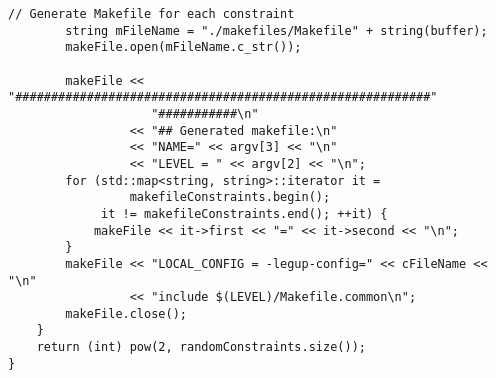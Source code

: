 \begin{lstlisting}[caption={Constraint-generation program source code}label=lst:constraintGenerating]
        // Generate Makefile for each constraint
        string mFileName = "./makefiles/Makefile" + string(buffer);
        makeFile.open(mFileName.c_str());

        makeFile << "##########################################################"
                    "###########\n"
                 << "## Generated makefile:\n"
                 << "NAME=" << argv[3] << "\n"
                 << "LEVEL = " << argv[2] << "\n";
        for (std::map<string, string>::iterator it =
                 makefileConstraints.begin();
             it != makefileConstraints.end(); ++it) {
            makeFile << it->first << "=" << it->second << "\n";
        }
        makeFile << "LOCAL_CONFIG = -legup-config=" << cFileName << "\n"
                 << "include $(LEVEL)/Makefile.common\n";
        makeFile.close();
    }
    return (int) pow(2, randomConstraints.size());
}
\end{lstlisting}